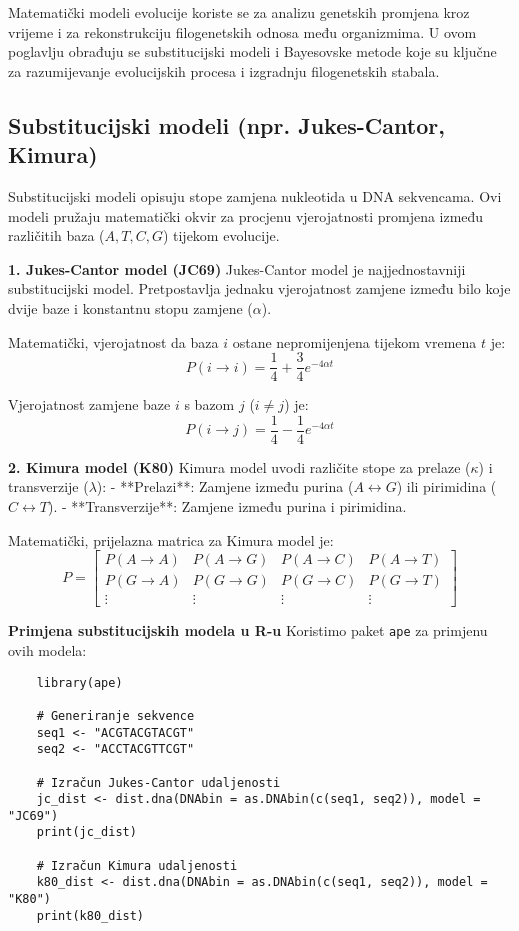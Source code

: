 \documentclass[10pt,a4paper,twoside]{article}
\begin{document}
Matematički modeli evolucije koriste se za analizu genetskih promjena kroz vrijeme i za rekonstrukciju filogenetskih odnosa među organizmima. U ovom poglavlju obrađuju se substitucijski modeli i Bayesovske metode koje su ključne za razumijevanje evolucijskih procesa i izgradnju filogenetskih stabala.

\subsection*{Substitucijski modeli (npr. Jukes-Cantor, Kimura)}

Substitucijski modeli opisuju stope zamjena nukleotida u DNA sekvencama. Ovi modeli pružaju matematički okvir za procjenu vjerojatnosti promjena između različitih baza (\( A, T, C, G \)) tijekom evolucije.

\textbf{1. Jukes-Cantor model (JC69)}  
Jukes-Cantor model je najjednostavniji substitucijski model. Pretpostavlja jednaku vjerojatnost zamjene između bilo koje dvije baze i konstantnu stopu zamjene (\( \alpha \)).

Matematički, vjerojatnost da baza \( i \) ostane nepromijenjena tijekom vremena \( t \) je:
\[
P(i \rightarrow i) = \frac{1}{4} + \frac{3}{4} e^{-4\alpha t}
\]

Vjerojatnost zamjene baze \( i \) s bazom \( j \) (\( i \neq j \)) je:
\[
P(i \rightarrow j) = \frac{1}{4} - \frac{1}{4} e^{-4\alpha t}
\]

\textbf{2. Kimura model (K80)}  
Kimura model uvodi različite stope za prelaze (\( \kappa \)) i transverzije (\( \lambda \)):
- **Prelazi**: Zamjene između purina (\( A \leftrightarrow G \)) ili pirimidina (\( C \leftrightarrow T \)).
- **Transverzije**: Zamjene između purina i pirimidina.

Matematički, prijelazna matrica za Kimura model je:
\[
P = 
\begin{bmatrix}
	P(A \rightarrow A) & P(A \rightarrow G) & P(A \rightarrow C) & P(A \rightarrow T) \\
	P(G \rightarrow A) & P(G \rightarrow G) & P(G \rightarrow C) & P(G \rightarrow T) \\
	\vdots & \vdots & \vdots & \vdots
\end{bmatrix}
\]

\textbf{Primjena substitucijskih modela u R-u}  
Koristimo paket \texttt{ape} za primjenu ovih modela:

\begin{verbatim}
	library(ape)
	
	# Generiranje sekvence
	seq1 <- "ACGTACGTACGT"
	seq2 <- "ACCTACGTTCGT"
	
	# Izračun Jukes-Cantor udaljenosti
	jc_dist <- dist.dna(DNAbin = as.DNAbin(c(seq1, seq2)), model = "JC69")
	print(jc_dist)
	
	# Izračun Kimura udaljenosti
	k80_dist <- dist.dna(DNAbin = as.DNAbin(c(seq1, seq2)), model = "K80")
	print(k80_dist)
\end{verbatim}
\end{document}
